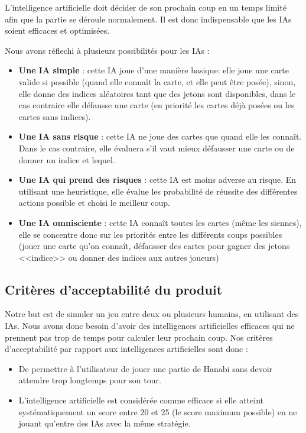 \documentclass{article}
\begin{document}
L’intelligence artificielle doit décider de son prochain coup en un temps limité afin que la partie se déroule normalement. Il est donc indispensable que les IAs soient efficaces et optimisées. 

{\normalfont Nous avons réflechi à plusieurs possibilités pour les IAs :}

\begin{itemize}
    \item {\bfseries Une IA simple} : cette IA joue d'une manière basique: elle joue une carte valide si possible (quand elle connaît la carte, et elle peut être posée), sinon, elle donne des indices aléatoires tant que des jetons sont disponibles, dans le cas contraire elle défausse une carte (en priorité les cartes déjà posées ou les cartes sans indices).
    \item {\bfseries Une IA sans risque} : cette IA ne joue des cartes que quand elle les connaît. Dans le cas contraire, elle évaluera s'il vaut mieux défausser une carte ou de donner un indice et lequel.
    \item {\bfseries Une IA qui prend des risques} : cette IA est moins adverse au risque. En utilisant une heuristique, elle évalue les probabilité de réussite des différentes actions possible et choisi le meilleur coup. 
    \item {\bfseries Une IA omnisciente} : cette IA connaît toutes les cartes (même les siennes), elle se concentre donc sur les priorités entre les différents coups possibles (jouer une carte qu'on connaît, défausser des cartes pour gagner des jetons <<indice>> ou donner des indices aux autres joueurs) 
\end{itemize}


\subsection{Critères d'acceptabilité du produit}

Notre but est de simuler un jeu entre deux ou plusieurs humains, en utilisant des IAs. Nous avons donc besoin d’avoir des intelligences artificielles efficaces qui ne prennent pas trop de temps pour calculer leur prochain coup. Nos critères d’acceptabilité par rapport aux intelligences artificielles sont donc :

\begin{itemize}
    \item De permettre à l’utilisateur de jouer une partie de Hanabi sans devoir attendre trop longtemps pour son tour.

    \item L’intelligence artificielle est considérée comme efficace si elle atteint systématiquement un score entre 20 et 25 (le score maximum possible) en ne jouant qu'entre des IAs avec la même stratégie.
\end{itemize}
\end{document}

